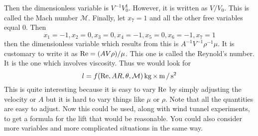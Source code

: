 Then the dimensionless variable is $V^{-1}V_{0}^{1}$. However, it is written
as $V/V_{0}$. This is called the Mach number $\mathcal{M}$. Finally, let
$x_{7}=1$ and all the other free variables equal 0. Then
\begin{equation*}
x_{1}=-1,x_{2}=0,x_{3}=0,x_{4}=-1,x_{5}=0,x_{6}=-1,x_{7}=1
\end{equation*}
then the dimensionless variable which results from this is $A^{-1}V^{-1}\rho
^{-1}\mu$. It is customary to write it as $\mathop{\textrm{\rm Re}}\nolimits=(AV\rho)
/\mu$. This one is called the Reynold's number. It is the one which
involves viscosity. Thus we would look for
\begin{equation*}
l=f(\mathop{\textrm{\rm Re}}\nolimits,AR,\theta ,\mathcal{M}) \mathop{\textrm{\rm kg}}\nolimits\times \mathop{\textrm{\rm m}}\nolimits/\mathop{\textrm{\rm s}}\nolimits^2
\end{equation*}
This is quite interesting because it is easy to vary $\mathop{\textrm{\rm Re}}\nolimits$ by simply
adjusting the velocity or $A$ but it is hard to vary things like $\mu $ or $%
\rho$. Note that all the quantities are easy to adjust. Now this could be
used, along with wind tunnel experiments, to get a formula for the lift that
would be reasonable. You could also consider more variables and more
complicated situations in the same way.

